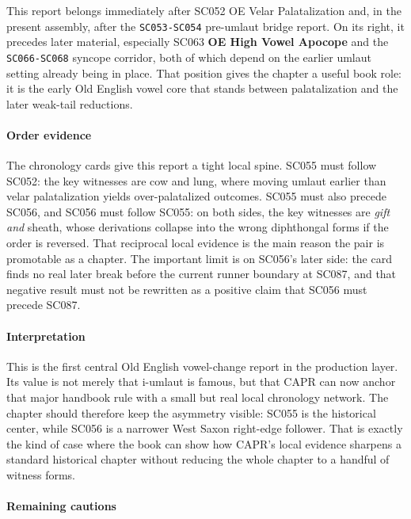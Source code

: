 \documentclass[
  british,
  a4paper,
]{article}
\begin{document}
This report belongs immediately after SC052 OE Velar Palatalization and,
in the present assembly, after the \texttt{SC053-SC054} pre-umlaut
bridge report. On its right, it precedes later material, especially
SC063 \textbf{OE High Vowel Apocope} and the \texttt{SC066-SC068}
syncope corridor, both of which depend on the earlier umlaut setting
already being in place. That position gives the chapter a useful book
role: it is the early Old English vowel core that stands between
palatalization and the later weak-tail reductions.

\paragraph{Order evidence}\label{order-evidence-34}

The chronology cards give this report a tight local spine. SC055 must
follow SC052: the key witnesses are cow and lung, where moving umlaut
earlier than velar palatalization yields over-palatalized outcomes.
SC055 must also precede SC056, and SC056 must follow SC055: on both
sides, the key witnesses are \emph{gift and }sheath, whose derivations
collapse into the wrong diphthongal forms if the order is reversed. That
reciprocal local evidence is the main reason the pair is promotable as a
chapter. The important limit is on SC056's later side: the card finds no
real later break before the current runner boundary at SC087, and that
negative result must not be rewritten as a positive claim that SC056
must precede SC087.

\paragraph{Interpretation}\label{interpretation-34}

This is the first central Old English vowel-change report in the
production layer. Its value is not merely that i-umlaut is famous, but
that CAPR can now anchor that major handbook rule with a small but real
local chronology network. The chapter should therefore keep the
asymmetry visible: SC055 is the historical center, while SC056 is a
narrower West Saxon right-edge follower. That is exactly the kind of
case where the book can show how CAPR's local evidence sharpens a
standard historical chapter without reducing the whole chapter to a
handful of witness forms.

\paragraph{Remaining cautions}\label{remaining-cautions-34}
\end{document}
